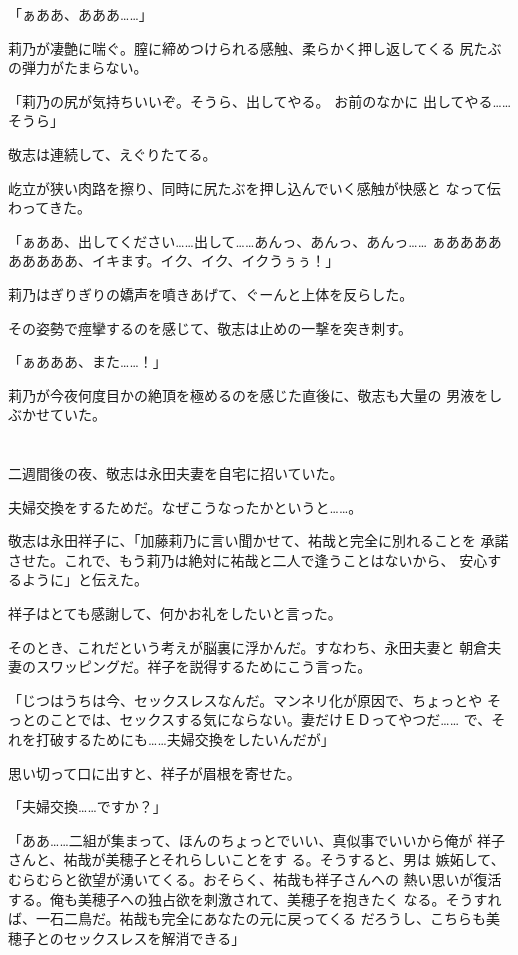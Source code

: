 ﻿\documentclass[
    book,tate,
    line_length=30zw,
    jafontsize=12pt,
    paper=b5j,
    landscape,
    ]{jlreq}
\begin{document}
「ぁああ、あああ……」

莉乃が凄艶に喘ぐ。膣に締めつけられる感触、柔らかく押し返してくる
尻たぶの弾力がたまらない。

「莉乃の尻が気持ちいいぞ。そうら、出してやる。 お前のなかに
出してやる……そうら」

敬志は連続して、えぐりたてる。

屹立が狭い肉路を擦り、同時に尻たぶを押し込んでいく感触が快感と
なって伝わってきた。

「ぁああ、出してください……出して……あんっ、あんっ、あんっ……
ぁあああああああああ、イキます。イク、イク、イクうぅぅ！」

莉乃はぎりぎりの嬌声を噴きあげて、ぐーんと上体を反らした。

その姿勢で痙攣するのを感じて、敬志は止めの一撃を突き刺す。

「ぁあああ、また……！」

莉乃が今夜何度目かの絶頂を極めるのを感じた直後に、敬志も大量の
男液をしぶかせていた。

\section*{}

二週間後の夜、敬志は永田夫妻を自宅に招いていた。

夫婦交換をするためだ。なぜこうなったかというと……。

敬志は永田祥子に、「加藤莉乃に言い聞かせて、祐哉と完全に別れることを
承諾させた。これで、もう莉乃は絶対に祐哉と二人で逢うことはないから、
安心するように」と伝えた。

祥子はとても感謝して、何かお礼をしたいと言った。

そのとき、これだという考えが脳裏に浮かんだ。すなわち、永田夫妻と
朝倉夫妻のスワッピングだ。祥子を説得するためにこう言った。

「じつはうちは今、セックスレスなんだ。マンネリ化が原因で、ちょっとや
そっとのことでは、セックスする気にならない。妻だけＥＤってやつだ……
で、それを打破するためにも……夫婦交換をしたいんだが」

思い切って口に出すと、祥子が眉根を寄せた。

「夫婦交換……ですか？」

「ああ……二組が集まって、ほんのちょっとでいい、真似事でいいから俺が
祥子さんと、祐哉が美穂子とそれらしいことをす る。そうすると、男は
嫉妬して、むらむらと欲望が湧いてくる。おそらく、祐哉も祥子さんへの
熱い思いが復活する。俺も美穂子への独占欲を刺激されて、美穂子を抱きたく
なる。そうすれば、一石二鳥だ。祐哉も完全にあなたの元に戻ってくる
だろうし、こちらも美穂子とのセックスレスを解消できる」
\end{document}
